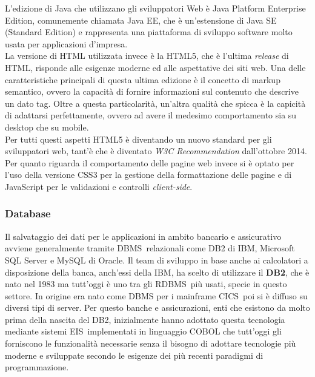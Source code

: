 	L'edizione di Java che utilizzano gli sviluppatori Web è Java Platform Enterprise Edition, comunemente chiamata Java EE, che è un'estensione di Java SE (Standard Edition) e rappresenta una piattaforma di sviluppo software molto usata per applicazioni d'impresa.\\
	
	La versione di HTML utilizzata invece è la HTML5, che è l'ultima \textit{release} di HTML, risponde alle esigenze moderne ed alle aspettative dei siti web. Una delle caratteristiche principali di questa ultima edizione è il concetto di markup semantico, ovvero la capacità di fornire informazioni sul contenuto che descrive un dato tag. Oltre a questa particolarità, un'altra qualità che spicca è la capicità di adattarsi perfettamente, ovvero ad avere il medesimo comportamento sia su desktop che su mobile. \\
	
	Per tutti questi aspetti HTML5 è diventando un nuovo standard per gli sviluppatori web, tant'è che è diventato \textit{W3C Recommendation} dall'ottobre 2014.\\

	Per quanto riguarda il comportamento delle pagine web invece si è optato per l'uso della versione CSS3 per la gestione della formattazione delle pagine e di JavaScript per le validazioni e controlli \textit{client-side}.
		
	\subsubsection{Database}
	Il salvataggio dei dati per le applicazioni in ambito bancario e assicurativo avviene generalmente tramite DBMS\glossario\ relazionali come DB2 di IBM, Microsoft SQL Server e MySQL di Oracle. Il team di sviluppo in base anche ai calcolatori a disposizione della banca, anch'essi della IBM, ha scelto di utilizzare il \textbf{DB2}, che è nato nel 1983 ma tutt'oggi è uno tra gli RDBMS\glossario\ più usati, specie in questo settore. In origine era nato come DBMS per i mainframe CICS\glossario\, poi si è diffuso su diversi tipi di server. Per questo banche e assicurazioni, enti che esistono da molto prima della nascita del DB2, inizialmente hanno adottato questa tecnologia mediante sistemi EIS\glossario\ implementati in linguaggio COBOL che tutt'oggi gli forniscono le funzionalità necessarie senza il bisogno di adottare tecnologie più moderne e sviluppate secondo le esigenze dei più recenti paradigmi di programmazione.\\
	
